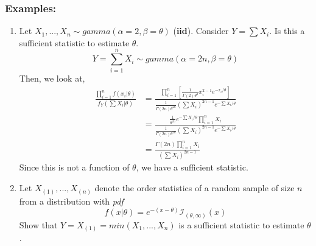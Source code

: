 \documentclass{article}
\begin{document}
\subsubsection*{Examples:}
\begin{enumerate}
    \item Let $X_1,...,X_n \sim gamma(\alpha=2,\beta = \theta)$ (\textbf{iid}). Consider $Y = \sum X_i$. Is this a sufficient statistic to estimate $\theta$.
    \begin{equation*}
        Y = \sum_{i=1}^n X_i \sim gamma(\alpha = 2n, \beta = \theta)
    \end{equation*}
    Then, we look at,
    \begin{equation*}
        \begin{split}
            \frac{\prod_{i=1}^n f(x_i|\theta)}{f_Y(\sum X_i|\theta)} &= \frac{\prod_{i=1}^n \left[ \frac{1}{\Gamma(2)\theta^2}x_i^{2-1} e^{-x_i/\theta} \right]}{\frac{1}{\Gamma(2n)\theta^{2n}} \left(\sum X_i\right)^{2n-1} e^{-\sum X_i/\theta} }\\
            &= \frac{\frac{1}{\theta^{2n}}e^{-\sum X_i/\theta}\prod_{i=1}^n X_i}{\frac{1}{\Gamma(2n)\theta^{2n}} \left(\sum X_i\right)^{2n-1} e^{-\sum X_i/\theta}}\\
            &= \frac{\Gamma(2n) \prod_{i=1}^n X_i}{\left(\sum X_i \right)^{2n-1}}
        \end{split}
    \end{equation*}
    Since this is not a function of $\theta$, we have a sufficient statistic.

    \item Let $X_{(1)},...,X_{(n)}$ denote the order statistics of a random sample of size $n$ from a distribution with \textit{pdf}
    \begin{equation*}
        f(x|\theta) = e^{-(x-\theta)}\mathcal{I}_{(\theta,\infty)}(x)
    \end{equation*}
    Show that $Y=X_{(1)} = min(X_1,...,X_n)$ is a sufficient statistic to estimate $\theta$.


\end{enumerate}
\end{document}
